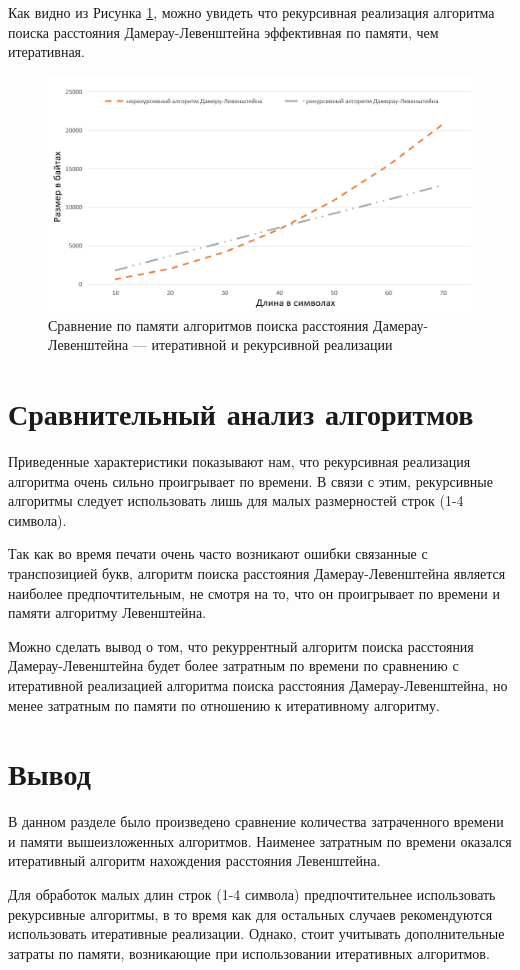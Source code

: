 Как видно из Рисунка \ref{plt:memory_1}, можно увидеть что рекурсивная реализация алгоритма поиска расстояния Дамерау-Левенштейна эффективная по памяти, чем итеративная.

\begin{figure}[h]
	\centering
	\includegraphics[height=0.3\textheight]{img/diag_04.png}
	\caption{Сравнение по памяти алгоритмов поиска расстояния Дамерау-Левенштейна --- итеративной и рекурсивной реализации}
	\label{plt:memory_1}
\end{figure}

\section{Сравнительный анализ алгоритмов}
Приведенные характеристики показывают нам, что рекурсивная реализация алгоритма очень сильно проигрывает по времени. В связи с этим, рекурсивные алгоритмы следует использовать лишь для малых размерностей строк (1-4 символа).

Так как во время печати очень часто возникают ошибки связанные с транспозицией букв, алгоритм поиска расстояния Дамерау-Левенштейна является наиболее предпочтительным, не смотря на то, что он проигрывает по времени и памяти алгоритму Левенштейна.

Можно сделать вывод о том, что рекуррентный алгоритм поиска расстояния Дамерау-Левенштейна будет более затратным по времени по сравнению с итеративной реализацией алгоритма поиска расстояния Дамерау-Левенштейна, но менее затратным по памяти по отношению к итеративному алгоритму.

\section{Вывод}
В данном разделе было произведено сравнение количества затраченного времени и памяти вышеизложенных алгоритмов. Наименее затратным по времени оказался итеративный алгоритм нахождения расстояния Левенштейна.

Для обработок малых длин строк (1-4 символа) предпочтительнее использовать рекурсивные алгоритмы, в то время как для остальных случаев рекомендуются использовать итеративные реализации. Однако, стоит учитывать дополнительные затраты по памяти, возникающие при использовании итеративных алгоритмов.
